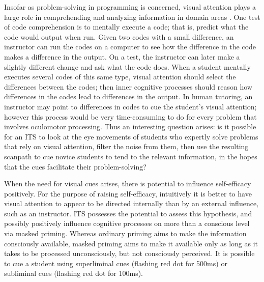 \documentclass[hidelinks,11pt]{article}
\begin{document}
Insofar as problem-solving in programming is concerned, visual attention plays
a large role in comprehending and analyzing information in domain areas
{\citep{reingold2011}}.  One test of code comprehension is to mentally execute
a code; that is, predict what the code would output when run.  Given two codes
with a small difference, an instructor can run the codes on a computer to see
how the difference in the code makes a difference in the output.  On a test,
the instructor can later make a slightly different change and ask what the code
does.  When a student mentally executes several codes of this same type, visual
attention should select the differences between the codes; then inner cognitive
processes should reason how differences in the codes lead to differences in the
output.  In human tutoring, an instructor may point to differences in codes to
cue the student's visual attention; however this process would be very
time-consuming to do for every problem that involves oculomotor processing.
Thus an interesting question arises: is it possible for an ITS to look at the
eye movements of students who expertly solve problems that rely on visual
attention, filter the noise from them, then use the resulting scanpath to cue
novice students to tend to the relevant information, in the hopes that the cues
facilitate their problem-solving?

When the need for visual cues arises, there is potential to influence
self-efficacy positively. For the purpose of raising self-efficacy, intuitively
it is better to have visual attention to appear to be directed internally than
by an external influence, such as an instructor.  ITS possesses the potential
to assess this hypothesis, and possibly positively influence cognitive
processes on more than a conscious level via masked priming. Whereas ordinary
priming aims to make the information consciously available, masked priming aims
to make it available only as long as it takes to be processed unconsciously,
but not consciously perceived.  It is possible to cue a student using
superliminal cues (flashing red dot for 500ms) or subliminal cues (flashing red
dot for 100ms).
\end{document}
